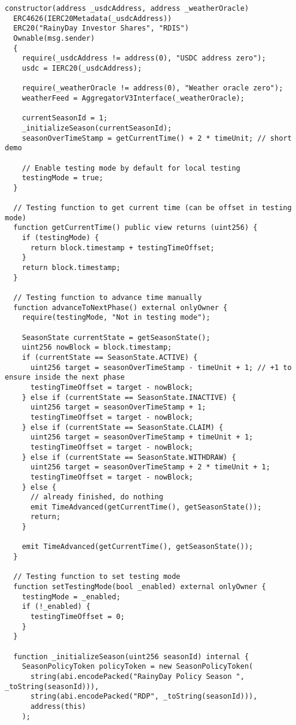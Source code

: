 \begin{lstlisting}[style=soliditystyle, caption={RainyDayFund.sol - Main Insurance Contract},label={lst:lstlisting}]
  constructor(address _usdcAddress, address _weatherOracle)
  ERC4626(IERC20Metadata(_usdcAddress))
  ERC20("RainyDay Investor Shares", "RDIS")
  Ownable(msg.sender)
  {
    require(_usdcAddress != address(0), "USDC address zero");
    usdc = IERC20(_usdcAddress);

    require(_weatherOracle != address(0), "Weather oracle zero");
    weatherFeed = AggregatorV3Interface(_weatherOracle);

    currentSeasonId = 1;
    _initializeSeason(currentSeasonId);
    seasonOverTimeStamp = getCurrentTime() + 2 * timeUnit; // short demo

    // Enable testing mode by default for local testing
    testingMode = true;
  }

  // Testing function to get current time (can be offset in testing mode)
  function getCurrentTime() public view returns (uint256) {
    if (testingMode) {
      return block.timestamp + testingTimeOffset;
    }
    return block.timestamp;
  }

  // Testing function to advance time manually
  function advanceToNextPhase() external onlyOwner {
    require(testingMode, "Not in testing mode");

    SeasonState currentState = getSeasonState();
    uint256 nowBlock = block.timestamp;
    if (currentState == SeasonState.ACTIVE) {
      uint256 target = seasonOverTimeStamp - timeUnit + 1; // +1 to ensure inside the next phase
      testingTimeOffset = target - nowBlock;
    } else if (currentState == SeasonState.INACTIVE) {
      uint256 target = seasonOverTimeStamp + 1;
      testingTimeOffset = target - nowBlock;
    } else if (currentState == SeasonState.CLAIM) {
      uint256 target = seasonOverTimeStamp + timeUnit + 1;
      testingTimeOffset = target - nowBlock;
    } else if (currentState == SeasonState.WITHDRAW) {
      uint256 target = seasonOverTimeStamp + 2 * timeUnit + 1;
      testingTimeOffset = target - nowBlock;
    } else {
      // already finished, do nothing
      emit TimeAdvanced(getCurrentTime(), getSeasonState());
      return;
    }

    emit TimeAdvanced(getCurrentTime(), getSeasonState());
  }

  // Testing function to set testing mode
  function setTestingMode(bool _enabled) external onlyOwner {
    testingMode = _enabled;
    if (!_enabled) {
      testingTimeOffset = 0;
    }
  }

  function _initializeSeason(uint256 seasonId) internal {
    SeasonPolicyToken policyToken = new SeasonPolicyToken(
      string(abi.encodePacked("RainyDay Policy Season ", _toString(seasonId))),
      string(abi.encodePacked("RDP", _toString(seasonId))),
      address(this)
    );


\end{lstlisting}
